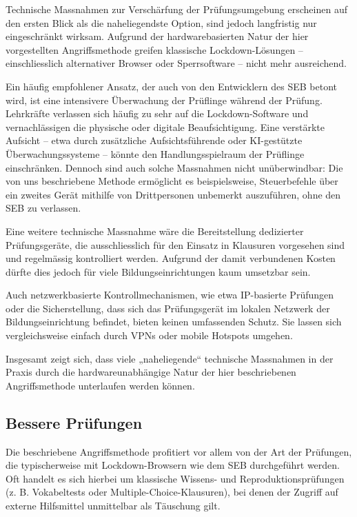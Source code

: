 \documentclass[14pt]{article}
\begin{document}
Technische Massnahmen zur Verschärfung der Prüfungsumgebung erscheinen auf den ersten Blick als die naheliegendste Option, sind jedoch langfristig nur eingeschränkt wirksam. Aufgrund der hardwarebasierten Natur der hier vorgestellten Angriffsmethode greifen klassische Lockdown-Lösungen – einschliesslich alternativer Browser oder Sperrsoftware – nicht mehr ausreichend.

Ein häufig empfohlener Ansatz, der auch von den Entwicklern des SEB betont wird, ist eine intensivere Überwachung der Prüflinge während der Prüfung. Lehrkräfte verlassen sich häufig zu sehr auf die Lockdown-Software und vernachlässigen die physische oder digitale Beaufsichtigung. Eine verstärkte Aufsicht – etwa durch zusätzliche Aufsichtsführende oder KI-gestützte Überwachungssysteme – könnte den Handlungsspielraum der Prüflinge einschränken. Dennoch sind auch solche Massnahmen nicht unüberwindbar: Die von uns beschriebene Methode ermöglicht es beispielsweise, Steuerbefehle über ein zweites Gerät mithilfe von Drittpersonen unbemerkt auszuführen, ohne den SEB zu verlassen.

Eine weitere technische Massnahme wäre die Bereitstellung dedizierter Prüfungsgeräte, die ausschliesslich für den Einsatz in Klausuren vorgesehen sind und regelmässig kontrolliert werden. Aufgrund der damit verbundenen Kosten dürfte dies jedoch für viele Bildungseinrichtungen kaum umsetzbar sein.

Auch netzwerkbasierte Kontrollmechanismen, wie etwa IP-basierte Prüfungen oder die Sicherstellung, dass sich das Prüfungsgerät im lokalen Netzwerk der Bildungseinrichtung befindet, bieten keinen umfassenden Schutz. Sie lassen sich vergleichsweise einfach durch VPNs oder mobile Hotspots umgehen.

Insgesamt zeigt sich, dass viele „naheliegende“ technische Massnahmen in der Praxis durch die hardwareunabhängige Natur der hier beschriebenen Angriffsmethode unterlaufen werden können.

\subsection{Bessere Prüfungen}

Die beschriebene Angriffsmethode profitiert vor allem von der Art der Prüfungen, die typischerweise mit Lockdown-Browsern wie dem SEB durchgeführt werden. Oft handelt es sich hierbei um klassische Wissens- und Reproduktionsprüfungen (z. B. Vokabeltests oder Multiple-Choice-Klausuren), bei denen der Zugriff auf externe Hilfsmittel unmittelbar als Täuschung gilt.
\end{document}
